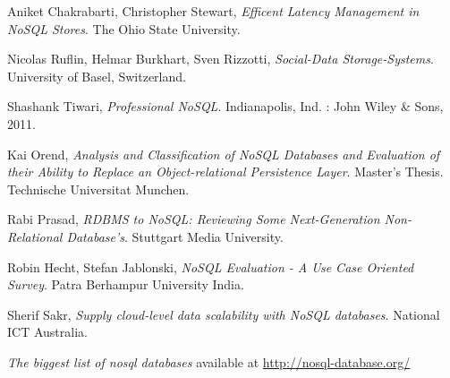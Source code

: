 \documentclass[times, 10pt,twocolumn]{article}
\begin{document}
\begin{thebibliography}{9}
  	  Aniket Chakrabarti, Christopher Stewart,
      \emph{Efficent Latency Management in NoSQL Stores}. The Ohio State University.
      
  	  Nicolas Ruﬂin, Helmar Burkhart, Sven Rizzotti, 
      \emph{Social-Data Storage-Systems}.  University of Basel, Switzerland.
      
  	  Shashank Tiwari, 
      \emph{Professional NoSQL}. Indianapolis, Ind. : John Wiley \& Sons, 2011.
      
  	  Kai Orend, 
      \emph{Analysis and Classification of NoSQL Databases and Evaluation of their Ability to Replace an Object-relational Persistence Layer}. Master's Thesis. Technische Universitat Munchen.
      
  	  Rabi Prasad, 
      \emph{RDBMS to NoSQL: Reviewing Some Next-Generation Non-Relational Database's}. Stuttgart Media University.
      
  	  Robin Hecht, Stefan Jablonski,
      \emph{NoSQL Evaluation - A Use Case Oriented Survey}. Patra Berhampur University India.
       
  	  Sherif Sakr, 
      \emph{Supply cloud-level data scalability with NoSQL databases}. National ICT Australia.
      
      \emph{The biggest list of nosql databases} available at
      \url{http://nosql-database.org/}
      

\end{thebibliography}
 



\end{document}
